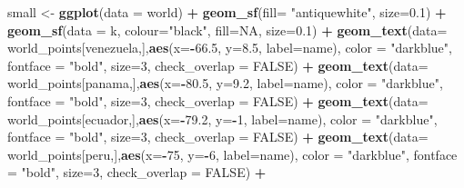 \documentclass[12pt,oneside]{reedthesis}
\newenvironment{Shaded}{\begin{snugshade}}{\end{snugshade}}
\newcommand{\DataTypeTok}[1]{\textcolor[rgb]{0.13,0.29,0.53}{#1}}
\newcommand{\DecValTok}[1]{\textcolor[rgb]{0.00,0.00,0.81}{#1}}
\newcommand{\FloatTok}[1]{\textcolor[rgb]{0.00,0.00,0.81}{#1}}
\newcommand{\KeywordTok}[1]{\textcolor[rgb]{0.13,0.29,0.53}{\textbf{#1}}}
\newcommand{\NormalTok}[1]{#1}
\newcommand{\OperatorTok}[1]{\textcolor[rgb]{0.81,0.36,0.00}{\textbf{#1}}}
\newcommand{\OtherTok}[1]{\textcolor[rgb]{0.56,0.35,0.01}{#1}}
\newcommand{\StringTok}[1]{\textcolor[rgb]{0.31,0.60,0.02}{#1}}
\begin{document}
\begin{Shaded}
\begin{Highlighting}[]
{{{{\NormalTok{small <-}\StringTok{ }\KeywordTok{ggplot}\NormalTok{(}\DataTypeTok{data =}\NormalTok{ world) }\OperatorTok{+}\StringTok{ }
\StringTok{  }\KeywordTok{geom_sf}\NormalTok{(}\DataTypeTok{fill=} \StringTok{"antiquewhite"}\NormalTok{,  }\DataTypeTok{size=}\FloatTok{0.1}\NormalTok{) }\OperatorTok{+}\StringTok{ }
\StringTok{  }\KeywordTok{geom_sf}\NormalTok{(}\DataTypeTok{data =}\NormalTok{ k, }\DataTypeTok{colour=}\StringTok{"black"}\NormalTok{, }\DataTypeTok{fill=}\OtherTok{NA}\NormalTok{, }\DataTypeTok{size=}\FloatTok{0.1}\NormalTok{) }\OperatorTok{+}\StringTok{ }
\StringTok{  }\KeywordTok{geom_text}\NormalTok{(}\DataTypeTok{data=}\NormalTok{ world_points[venezuela,],}\KeywordTok{aes}\NormalTok{(}\DataTypeTok{x=}\OperatorTok{-}\FloatTok{66.5}\NormalTok{, }\DataTypeTok{y=}\FloatTok{8.5}\NormalTok{, }\DataTypeTok{label=}\NormalTok{name), }\DataTypeTok{color =} \StringTok{"darkblue"}\NormalTok{, }\DataTypeTok{fontface =} \StringTok{"bold"}\NormalTok{, }\DataTypeTok{size=}\DecValTok{3}\NormalTok{, }\DataTypeTok{check_overlap =} \OtherTok{FALSE}\NormalTok{) }\OperatorTok{+}
\StringTok{  }\KeywordTok{geom_text}\NormalTok{(}\DataTypeTok{data=}\NormalTok{ world_points[panama,],}\KeywordTok{aes}\NormalTok{(}\DataTypeTok{x=}\OperatorTok{-}\FloatTok{80.5}\NormalTok{, }\DataTypeTok{y=}\FloatTok{9.2}\NormalTok{, }\DataTypeTok{label=}\NormalTok{name), }\DataTypeTok{color =} \StringTok{"darkblue"}\NormalTok{, }\DataTypeTok{fontface =} \StringTok{"bold"}\NormalTok{, }\DataTypeTok{size=}\DecValTok{3}\NormalTok{, }\DataTypeTok{check_overlap =} \OtherTok{FALSE}\NormalTok{) }\OperatorTok{+}\StringTok{ }
\StringTok{  }\KeywordTok{geom_text}\NormalTok{(}\DataTypeTok{data=}\NormalTok{ world_points[ecuador,],}\KeywordTok{aes}\NormalTok{(}\DataTypeTok{x=}\OperatorTok{-}\FloatTok{79.2}\NormalTok{, }\DataTypeTok{y=}\OperatorTok{-}\DecValTok{1}\NormalTok{, }\DataTypeTok{label=}\NormalTok{name), }\DataTypeTok{color =} \StringTok{"darkblue"}\NormalTok{, }\DataTypeTok{fontface =} \StringTok{"bold"}\NormalTok{, }\DataTypeTok{size=}\DecValTok{3}\NormalTok{, }\DataTypeTok{check_overlap =} \OtherTok{FALSE}\NormalTok{) }\OperatorTok{+}
\StringTok{  }\KeywordTok{geom_text}\NormalTok{(}\DataTypeTok{data=}\NormalTok{ world_points[peru,],}\KeywordTok{aes}\NormalTok{(}\DataTypeTok{x=}\OperatorTok{-}\DecValTok{75}\NormalTok{, }\DataTypeTok{y=}\OperatorTok{-}\DecValTok{6}\NormalTok{, }\DataTypeTok{label=}\NormalTok{name), }\DataTypeTok{color =} \StringTok{"darkblue"}\NormalTok{, }\DataTypeTok{fontface =} \StringTok{"bold"}\NormalTok{, }\DataTypeTok{size=}\DecValTok{3}\NormalTok{, }\DataTypeTok{check_overlap =} \OtherTok{FALSE}\NormalTok{) }\OperatorTok{+}
}}}}
\end{Highlighting}
\end{Shaded}
\end{document}
